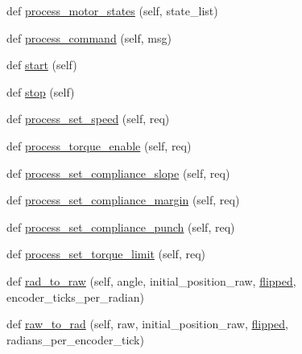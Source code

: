 \begin{DoxyCompactItemize}
\item 
def \hyperlink{classdynamixel__controllers_1_1joint__torque__controller__dual__motor_1_1_joint_torque_controller_dual_motor_a97f500e3caad45a3050e41b31642cc5d}{process\+\_\+motor\+\_\+states} (self, state\+\_\+list)
\item 
def \hyperlink{classdynamixel__controllers_1_1joint__torque__controller__dual__motor_1_1_joint_torque_controller_dual_motor_ae64e20c0e569930cdda1fc75460ae422}{process\+\_\+command} (self, msg)
\item 
def \hyperlink{classdynamixel__controllers_1_1joint__controller_1_1_joint_controller_a8da16a8b801f868a4de7c68d6adc851f}{start} (self)
\item 
def \hyperlink{classdynamixel__controllers_1_1joint__controller_1_1_joint_controller_a978da6ac850b0dd6a67ebe4a23f8fcdc}{stop} (self)
\item 
def \hyperlink{classdynamixel__controllers_1_1joint__controller_1_1_joint_controller_a97af096c1566307859ed168c900fa8a6}{process\+\_\+set\+\_\+speed} (self, req)
\item 
def \hyperlink{classdynamixel__controllers_1_1joint__controller_1_1_joint_controller_a2181fcf467234ed09e378a93ea5a0553}{process\+\_\+torque\+\_\+enable} (self, req)
\item 
def \hyperlink{classdynamixel__controllers_1_1joint__controller_1_1_joint_controller_a6390c0c20afc0581dd3b1122c894d175}{process\+\_\+set\+\_\+compliance\+\_\+slope} (self, req)
\item 
def \hyperlink{classdynamixel__controllers_1_1joint__controller_1_1_joint_controller_aed0bae387958b56f88fd707e9da9e8f1}{process\+\_\+set\+\_\+compliance\+\_\+margin} (self, req)
\item 
def \hyperlink{classdynamixel__controllers_1_1joint__controller_1_1_joint_controller_ac3d7aea8d47f24ab10c1162f34cce44f}{process\+\_\+set\+\_\+compliance\+\_\+punch} (self, req)
\item 
def \hyperlink{classdynamixel__controllers_1_1joint__controller_1_1_joint_controller_aa199ce6ae353ed44fe71ae96a5da242d}{process\+\_\+set\+\_\+torque\+\_\+limit} (self, req)
\item 
def \hyperlink{classdynamixel__controllers_1_1joint__controller_1_1_joint_controller_aea21e76e178029b31cd40b3e0335b621}{rad\+\_\+to\+\_\+raw} (self, angle, initial\+\_\+position\+\_\+raw, \hyperlink{classdynamixel__controllers_1_1joint__torque__controller__dual__motor_1_1_joint_torque_controller_dual_motor_a706ed08004b65f2928459293dea6c95c}{flipped}, encoder\+\_\+ticks\+\_\+per\+\_\+radian)
\item 
def \hyperlink{classdynamixel__controllers_1_1joint__controller_1_1_joint_controller_a58a58e669c2918d00cc358f2b58d061c}{raw\+\_\+to\+\_\+rad} (self, raw, initial\+\_\+position\+\_\+raw, \hyperlink{classdynamixel__controllers_1_1joint__torque__controller__dual__motor_1_1_joint_torque_controller_dual_motor_a706ed08004b65f2928459293dea6c95c}{flipped}, radians\+\_\+per\+\_\+encoder\+\_\+tick)
\end{DoxyCompactItemize}
